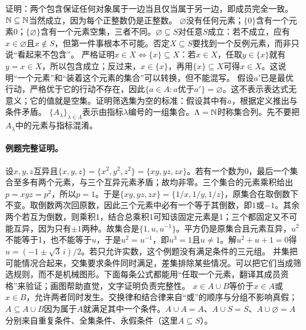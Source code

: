 证明：两个包含保证任何对象属于一边当且仅当属于另一边，即成员完全一致。$\mathbb{N}\subseteq\mathbb{N}$当然成立，因为每个正整数仍是正整数。
$\varnothing$没有任何元素；$\{0\}$含有一个元素0；$\{\varnothing\}$含有一个元素空集，三者不同。$\varnothing\subseteq S$对任意$S$成立：若不成立，应有$x\in\varnothing$且$x\notin S$，但第一件事根本不可能。否定$X\subseteq S$要找到一个反例元素，而非只说“看起来不包含”。
严格证明$x\in X\iff\{x\}\subseteq X$：若$x\in X$，任取$y\in\{x\}$就有$y=x\in X$，所以包含成立；反过来，$x\in\{x\}$，再用$\{x\}\subseteq X$可得$x\in X$。这说明“一个元素”和“装着这个元素的集合”可以转换，但不能混写。
假设$a'$已是最优行动，严格优于它的行动不存在，因此$\{a\in A:a\text{优于}a'\}=\varnothing$。这不表示表达式无意义；它的值就是空集。证明筛选集为空的标准：假设其中有$a$，根据定义推出与条件矛盾。
$\{A_\lambda\}_{\lambda\in\Lambda}$表示由指标$\lambda$编号的一组集合。$\Lambda=\mathbb{N}$时称集合列。先不要把$A_\lambda$中的元素与指标混淆。
\paragraph{例题完整证明。}设$x,y,z$互异且$\{x,y,z\}=\{x^2,y^2,z^2\}=\{xy,yz,zx\}$。若有一个数为0，最后一个集合至多有两个元素，与三个互异元素矛盾；故均非零。三个集合的元素乘积给出$p=xyz=p^2$，所以$p=1$。于是$\{xy,yz,zx\}=\{1/x,1/y,1/z\}$，原集合在取倒数下不变。取倒数两次回原数，因此三个元素中必有一个等于其倒数，即$1$或$-1$。其余两个若互为倒数，则乘积1，结合总乘积1可知该固定元素是1；三个都固定又不可能互异，因为只有$\pm1$两种。故集合是$\{1,u,u^{-1}\}$。平方仍是原集合且元素互异，$u^2$不能等于1，也不能等于$u$，于是$u^2=u^{-1}$，即$u^3=1$且$u\ne1$。解$u^2+u+1=0$得$u=(-1\pm\sqrt3\,i)/2$。若只允许实数，这个例题没有满足条件的三元组。
并集把可能情况合起来，交集要求条件同时满足，差集排除某些情况。可以把它们当成筛选规则，而不是机械图形。下面每条公式都能用“任取一个元素，翻译其成员资格”来验证；画图帮助直觉，文字证明负责完整性。
$x\in A\cup B$等价于$x\in A$或$x\in B$，允许两者同时发生。交换律和结合律来自“或”的顺序与分组不影响真假；$A\subseteq A\cup B$因为属于$A$就满足其中一个条件。$A\cup A=A$、$A\cup S=S$、$A\cup\varnothing=A$分别来自重复条件、全集条件、永假条件（这里$A\subseteq S$）。
